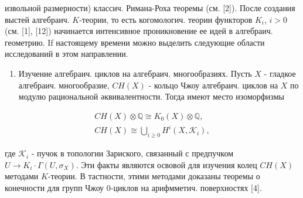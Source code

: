 \documentclass[10pt]{article}
\begin{document}
извольной размерности) классич. Римана-Роха теоремы (см. [2]). После создания выстей алгебраич. $K$-теории, то есть когомологич. теории функторов $K_{i}$, $i>0$ (см. [1], [12]) начинается интенсивное проникновение ее идей в алгебраич. геометрию. If настоящему времени можно выделить следующие области исследований в этом направлении.



\begin{enumerate}

  \item Изучение алгебраич. циклов на алгебраич. многообразиях. Пусть $X$ - гладкое алгебраич. многообразие, $C H(X)$ - кольцо Чжоу алгебраич. циклов на $X$ по модулю рациональной әквивалентности. Тогда имеют место изоморфизмы

\end{enumerate}



\[

\begin{gathered}

C H(X) \otimes \mathbb{Q} \cong K_{0}(X) \otimes \mathbb{Q}, \\

C H(X) \cong \bigcup_{i \geqslant 0} H^{i}\left(X, \mathscr{K}_{i}\right),

\end{gathered}

\]



где $\mathscr{K}_{i}$ - пучок в топологии Зариского, связанный с предпучком $U \rightarrow K_{i} \cdot \Gamma\left(U, \sigma_{X}\right)$. Эти факты являются освовой для изучения колец $C H(X)$ методами $K$-теории. В тастности, этими методами доказаны теоремы о конечности для групп Чжоу 0-циклов на арифмметич. поверхностях [4].
\end{document}
